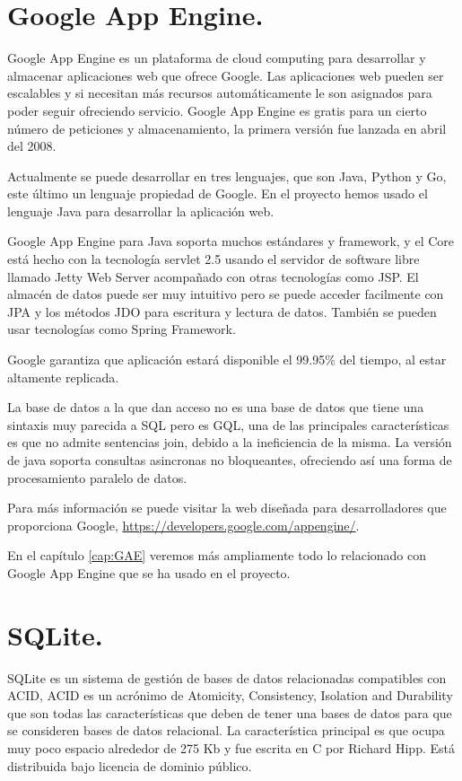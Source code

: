 \section{Google App Engine.}

Google App Engine es un plataforma de cloud computing para desarrollar y almacenar aplicaciones web que ofrece Google. Las aplicaciones web pueden ser escalables y si necesitan más recursos automáticamente le son asignados para poder seguir ofreciendo servicio. Google App Engine es gratis para un cierto número de peticiones y almacenamiento, la primera versión fue lanzada en abril del 2008.

Actualmente se puede desarrollar en tres lenguajes, que son Java, Python y Go, este último un lenguaje propiedad de Google. En el proyecto hemos usado el lenguaje Java para desarrollar la aplicación web. 

Google App Engine para Java soporta muchos estándares y framework, y el Core está hecho con la tecnología servlet 2.5 usando el servidor de software libre llamado Jetty Web Server acompañado con otras tecnologías como JSP. El almacén de datos puede ser muy intuitivo pero se puede acceder facilmente con JPA y los métodos JDO para escritura y lectura de datos. También se pueden usar tecnologías como Spring Framework.

Google garantiza que aplicación estará disponible el 99.95\% del tiempo, al estar altamente replicada.

La base de datos a la que dan acceso no es una base de datos que tiene una sintaxis muy parecida a SQL pero es GQL, una de las principales características es que no admite sentencias join, debido a la ineficiencia de la misma. La versión de java soporta consultas asincronas no bloqueantes, ofreciendo así una forma de procesamiento paralelo de datos.

Para más información se puede visitar la web diseñada para desarrolladores que proporciona Google, \url{https://developers.google.com/appengine/}. 

En el capítulo \ref{cap:GAE} veremos más ampliamente todo lo relacionado con Google App Engine que se ha usado en el proyecto.

\section{SQLite.}

SQLite es un sistema de gestión de bases de datos relacionadas compatibles con ACID, ACID es un acrónimo de Atomicity, Consistency, Isolation and Durability que son todas las características que deben de tener una bases de datos para que se consideren bases de datos relacional. La característica principal es que ocupa muy poco espacio alrededor de 275 Kb y fue escrita en C por Richard Hipp. Está distribuida bajo licencia de dominio público.

